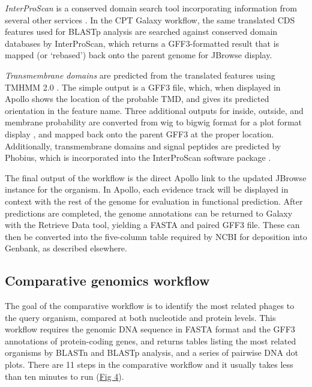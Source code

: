 \emph{InterProScan} is a conserved domain search tool incorporating
information from several other services \cite{Quevillon_2005,Zdobnov_2001,Hunter_2009,Jones_2014}. In the CPT Galaxy
workflow, the same translated CDS features used for BLASTp analysis are
searched against conserved domain databases by InterProScan, which
returns a GFF3-formatted result that is mapped (or `rebased') back onto
the parent genome for JBrowse display.

\emph{Transmembrane domains} are predicted from the translated features
using TMHMM 2.0 \cite{Krogh_2001}. The simple output is a GFF3 file, which, when
displayed in Apollo shows the location of the probable TMD, and gives
its predicted orientation in the feature name. Three additional outputs
for inside, outside, and membrane probability are converted from wig to
bigwig format for a plot format display \cite{Kent_2010}, and mapped back onto
the parent GFF3 at the proper location. Additionally, transmembrane
domains and signal peptides are predicted by Phobius, which is
incorporated into the InterProScan software package \cite{Jones_2014,Kent_2010,K_ll_2004}.

The final output of the workflow is the direct Apollo link to the
updated JBrowse instance for the organism. In Apollo, each evidence
track will be displayed in context with the rest of the genome for
evaluation in functional prediction. After predictions are completed,
the genome annotations can be returned to Galaxy with the Retrieve Data
tool, yielding a FASTA and paired GFF3 file. These can then be converted
into the five-column table required by NCBI for deposition into Genbank,
as described elsewhere.

\subsection*{Comparative genomics workflow}

The goal of the comparative workflow is to identify the most related
phages to the query organism, compared at both nucleotide and protein
levels. This workflow requires the genomic DNA sequence in FASTA format
and the GFF3 annotations of protein-coding genes, and returns tables
listing the most related organisms by BLASTn and BLASTp analysis, and a
series of pairwise DNA dot plots. There are 11 steps in the comparative
workflow and it usually takes less than ten minutes to run
(\protect\hyperlink{pcbi.1008214.g004}{Fig 4}).

